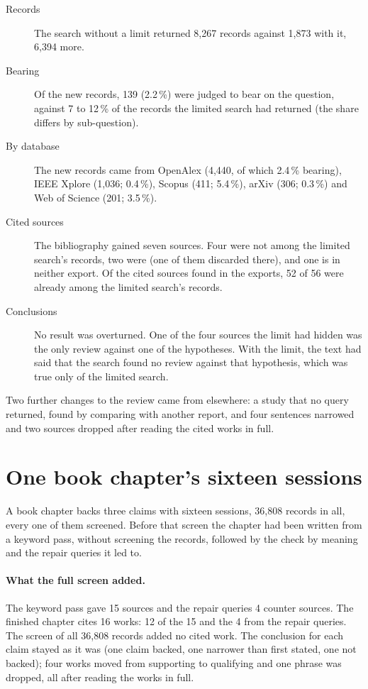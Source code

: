 \begin{description}
\item[Records] The search without a limit returned 8,267 records
  against 1,873 with it, 6,394 more.
\item[Bearing] Of the new records, 139 (2.2\,\%) were judged to bear on
  the question, against 7 to 12\,\% of the records the limited search
  had returned (the share differs by sub-question).
\item[By database] The new records came from OpenAlex (4,440, of which
  2.4\,\% bearing), IEEE Xplore (1,036; 0.4\,\%), Scopus (411; 5.4\,\%),
  arXiv (306; 0.3\,\%) and Web of Science (201; 3.5\,\%).
\item[Cited sources] The bibliography gained seven sources.
  Four were not among the limited search's records, two were (one of
  them discarded there), and one is in neither export.
  Of the cited sources found in the exports, 52 of 56 were already among
  the limited search's records.
\item[Conclusions] No result was overturned.
  One of the four sources the limit had hidden was the only review
  against one of the hypotheses.
  With the limit, the text had said that the search found no review
  against that hypothesis, which was true only of the limited search.
\end{description}

Two further changes to the review came from elsewhere: a study that no
query returned, found by comparing with another report, and four
sentences narrowed and two sources dropped after reading the cited works
in full.

\section{One book chapter's sixteen sessions}
\label{sec:measured-chapter}

A book chapter backs three claims with sixteen sessions, 36,808 records
in all, every one of them screened.
Before that screen the chapter had been written from a keyword pass,
without screening the records, followed by the check by meaning and the
repair queries it led to.

\paragraph{What the full screen added.}
The keyword pass gave 15 sources and the repair queries 4 counter
sources.
The finished chapter cites 16 works: 12 of the 15 and the 4 from the
repair queries.
The screen of all 36,808 records added no cited work.
The conclusion for each claim stayed as it was (one claim backed, one
narrower than first stated, one not backed); four works moved from
supporting to qualifying and one phrase was dropped, all after reading
the works in full.


